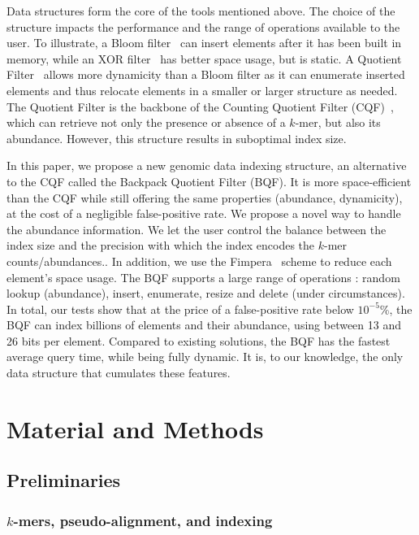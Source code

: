 Data structures form the core of the tools mentioned above. The choice of the structure impacts the performance and the range of operations available to the user. To illustrate, a Bloom filter~\cite{bloom_filter_1970} can insert elements after it has been built in memory, while an XOR filter~\cite{xor_filter_2020, binary_fuse_filter_2022} has better space usage, but is static. A Quotient Filter~\cite{quotient_filter_2012} allows more dynamicity than a Bloom filter as it can enumerate inserted elements and thus relocate elements in a smaller or larger structure as needed. The Quotient Filter is the backbone of the Counting Quotient Filter (CQF)~\cite{counting_quotient_filter_2017}, which can retrieve not only the presence or absence of a $k$-mer, but also its abundance. However, this structure results in suboptimal index size.

In this paper, we propose a new genomic data indexing structure, an alternative to the CQF called the Backpack Quotient Filter (BQF). It is more space-efficient than the CQF while still offering the same properties (abundance, dynamicity), at the cost of a negligible false-positive rate. We propose a novel way to handle the abundance information. We let the user control the balance between the index size and the precision with which the index encodes the $k$-mer counts/abundances.. In addition, we use the Fimpera~\cite{fimpera_2023} scheme to reduce each element's space usage. The BQF supports a large range of operations : random lookup (abundance), insert, enumerate, resize and delete (under circumstances).
In total, our tests show that at the price of a false-positive rate below $10^{-5}$\%, the BQF can index billions of elements and their abundance, using between 13 and 26 bits per element. Compared to existing solutions, the BQF has the fastest average query time, while being fully dynamic. It is, to our knowledge, the only data structure that cumulates these features.

\section{Material and Methods}

\subsection{Preliminaries}

\subsubsection{$k$-mers, pseudo-alignment, and indexing}

